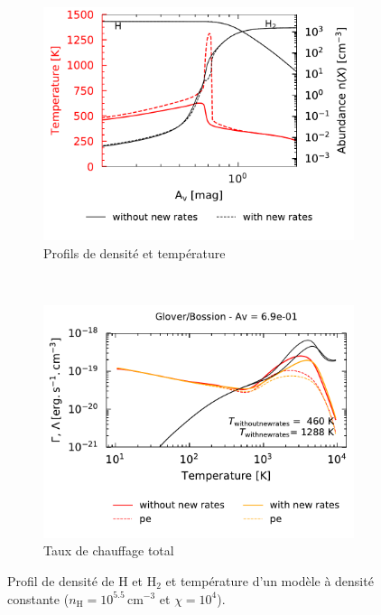 \begin{figure}[!h]
    \centering
    \begin{subfigure}[t]{0.49\textwidth} %
        \centering \includegraphics[trim = {0 0 0 0 },clip,width=1\textwidth]{figure/H2/pic/profilT.pdf}
        \caption{Profils de densité et température}
        \label{fig:H2:Bossion:profilT}
    \end{subfigure}
    ~ 
    \begin{subfigure}[t]{0.49\textwidth}
        \centering \includegraphics[trim = {0 0 0 1cm },clip,width=1\textwidth]{figure/H2/pic/GCcomp_h_6p9em01.pdf}
        \caption{Taux de chauffage total}
         \label{fig:H2:Bossion:zer}
    \end{subfigure}
    \caption{Profil de densité de $\mathrm{H}$ et $\mathrm{H}_2$ et température d'un modèle à densité constante ($n_\mathrm{H} = 10^{5.5}\,\mathrm{cm}^{-3}$ et $\chi = 10^4$).}
\end{figure}




